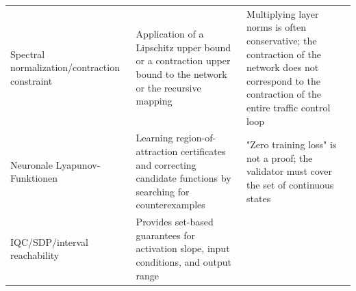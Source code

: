 \documentclass[11pt,a4paper,openany]{book}
\numberwithin{equation}{chapter}
\numberwithin{figure}{chapter}
\numberwithin{table}{chapter}
\begin{document}
\begin{center}
\begin{tabular}{p{3.0cm}p{5.0cm}p{6.1cm}}
Spectral normalization/contraction constraint






&






Application of a Lipschitz upper bound or a contraction upper bound to the network or the recursive mapping






&






Multiplying layer norms is often conservative; the contraction of the network does not correspond to the contraction of the entire traffic control loop





\\







Neuronale Lyapunov-Funktionen




&






Learning region-of-attraction certificates and correcting candidate functions by searching for counterexamples






&






"Zero training loss" is not a proof; the validator must cover the set of continuous states

\\




IQC/SDP/interval reachability






&






Provides set-based guarantees for activation slope, input conditions, and output range






&







\end{tabular}
\end{center}
\end{document}
